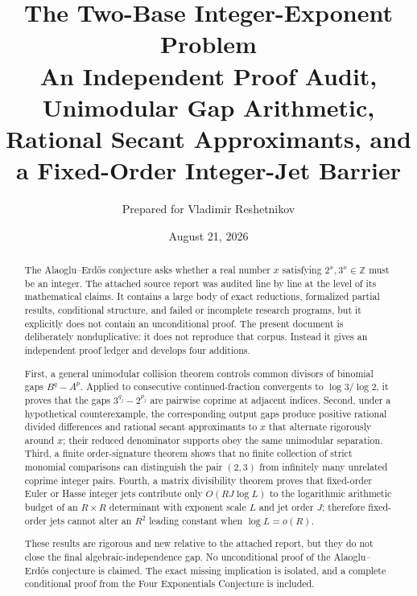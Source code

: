 \documentclass[11pt,oneside]{article}
\title{\textbf{The Two-Base Integer-Exponent Problem}\\[0.3em]
\Large An Independent Proof Audit, Unimodular Gap Arithmetic,\\
Rational Secant Approximants, and a Fixed-Order Integer-Jet Barrier}
\author{Prepared for Vladimir Reshetnikov}
\date{August 21, 2026}
\theoremstyle{definition}
\theoremstyle{remark}
\newcommand{\Z}{\mathbb Z}
\newcommand{\AEconj}{Alaoglu--Erd\H{o}s}
\newcommand{\fourE}{Four Exponentials Conjecture}
\begin{document}
\maketitle

\begin{abstract}
The \AEconj{} conjecture asks whether a real number $x$ satisfying
$2^x,3^x\in\Z$ must be an integer.  The attached source report was audited
line by line at the level of its mathematical claims.  It contains a large
body of exact reductions, formalized partial results, conditional structure,
and failed or incomplete research programs, but it explicitly does not
contain an unconditional proof.  The present document is deliberately
nonduplicative: it does not reproduce that corpus.  Instead it gives an
independent proof ledger and develops four additions.

First, a general unimodular collision theorem controls common divisors of
binomial gaps $B^q-A^p$.  Applied to consecutive continued-fraction
convergents to $\log 3/\log 2$, it proves that the gaps
$3^{q_j}-2^{p_j}$ are pairwise coprime at adjacent indices.  Second, under a
hypothetical counterexample, the corresponding output gaps produce positive
rational divided differences and rational secant approximants to $x$ that
alternate rigorously around $x$; their reduced denominator supports obey the
same unimodular separation.  Third, a finite order-signature theorem shows
that no finite collection of strict monomial comparisons can distinguish the
pair $(2,3)$ from infinitely many unrelated coprime integer pairs.  Fourth, a
matrix divisibility theorem proves that fixed-order Euler or Hasse integer
jets contribute only $O(RJ\log L)$ to the logarithmic arithmetic budget of an
$R\times R$ determinant with exponent scale $L$ and jet order $J$; therefore
fixed-order jets cannot alter an $R^2$ leading constant when $\log L=o(R)$.

These results are rigorous and new relative to the attached report, but they
do not close the final algebraic-independence gap.  No unconditional proof of
the \AEconj{} conjecture is claimed.  The exact missing implication is isolated,
and a complete conditional proof from the \fourE{} is included.
\end{abstract}
\end{document}
